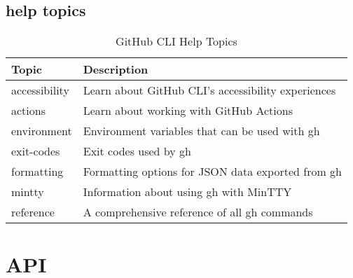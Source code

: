 \documentclass[openany, 12pt]{book}
\begin{document}
\chapter{help topics}
\begin{table}[h]
	\centering
	\begin{tabular}{ll}
		\toprule
		\textbf{Topic} & \textbf{Description}                               \\
		\midrule
		accessibility  & Learn about GitHub CLI's accessibility experiences \\
		actions        & Learn about working with GitHub Actions            \\
		environment    & Environment variables that can be used with gh     \\
		exit-codes     & Exit codes used by gh                              \\
		formatting     & Formatting options for JSON data exported from gh  \\
		mintty         & Information about using gh with MinTTY             \\
		reference      & A comprehensive reference of all gh commands       \\
		\bottomrule
	\end{tabular}
	\caption{GitHub CLI Help Topics}
\end{table}


\part{API}
\end{document}
